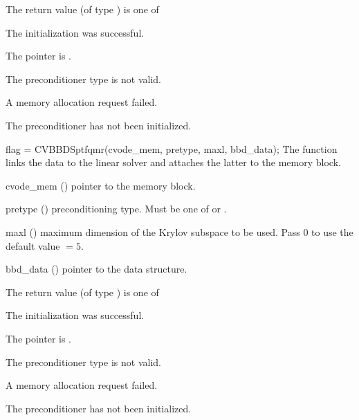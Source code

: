{
  The return value  (of type ) is one of
  \begin{args}
  \item[\Id{CVSPBCG\_SUCCESS}] 
    The {\cvspbcg} initialization was successful.
  \item[\Id{CVSPBCG\_MEM\_NULL}]
    The  pointer is .
  \item[\Id{CVSPBCG\_ILL\_INPUT}]
    The preconditioner type  is not valid.
  \item[\Id{CVSPBCG\_MEM\_FAIL}]
    A memory allocation request failed.
  \item[\Id{CV\_PDATA\_NULL}]
    The {\cvbbdpre} preconditioner has not been initialized.
  \end{args}
}
{}
{
  flag = CVBBDSptfqmr(cvode\_mem, pretype, maxl, bbd\_data);
}
{
  The function  links the {\cvbbdpre} data to the
  {\cvsptfqmr} linear solver and attaches the latter to the {\cvode}
  memory block.
}
{
  \begin{args}
  \item[cvode\_mem] ()
    pointer to the {\cvode} memory block.
  \item[pretype] ()
    preconditioning type. Must be one of  or .
  \item[maxl] ()
    maximum dimension of the Krylov subspace to be used. Pass $0$ to use the 
    default value  $= 5$.
  \item[bbd\_data] ()
    pointer to the {\cvbbdpre} data structure.
  \end{args}
}
{
  The return value  (of type ) is one of
  \begin{args}
  \item[\Id{CVSPTFQMR\_SUCCESS}] 
    The {\cvsptfqmr} initialization was successful.
  \item[\Id{CVSPTFQMR\_MEM\_NULL}]
    The  pointer is .
  \item[\Id{CVSPTFQMR\_ILL\_INPUT}]
    The preconditioner type  is not valid.
  \item[\Id{CVSPTFQMR\_MEM\_FAIL}]
    A memory allocation request failed.
  \item[\Id{CV\_PDATA\_NULL}]
    The {\cvbbdpre} preconditioner has not been initialized.
  \end{args}
}
